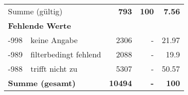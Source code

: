 \begin{longtable}{lXrrr}
     \midrule
     \multicolumn{2}{l}{Summe (gültig)} &
       \textbf{\num{793}} &
     \textbf{100} &
       \textbf{\num[round-mode=places,round-precision=2]{7,56}} \\
     \multicolumn{5}{l}{\textbf{Fehlende Werte}}\\
       -998 &
       keine Angabe &
         \num{2306} &
        - &
         \num[round-mode=places,round-precision=2]{21,97} \\
       -989 &
       filterbedingt fehlend &
         \num{2088} &
        - &
         \num[round-mode=places,round-precision=2]{19,9} \\
       -988 &
       trifft nicht zu &
         \num{5307} &
        - &
         \num[round-mode=places,round-precision=2]{50,57} \\
     \midrule
     \multicolumn{2}{l}{\textbf{Summe (gesamt)}} &
          \textbf{\num{10494}} &
        \textbf{-} &
        \textbf{100} \\
     \bottomrule
     \end{longtable}
     
